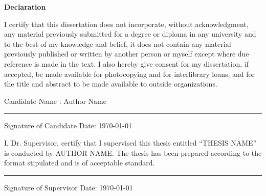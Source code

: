 \begin{center}
 \textbf{Declaration}\\
\end{center}


I certify that this dissertation does not incorporate, without acknowledgment, any material previously submitted for a degree or diploma in any university and to the best of my knowledge and belief, it does not contain any material previously published or written by another person or myself except where due reference is made in the text. I also hereby give consent for my dissertation, if accepted, be made available for photocopying and for interlibrary loans, and for the title and abstract to be made available to outside organizations.

\vspace{20mm}  %
Candidate Name : Author Name
\vspace{20mm}  %

\rule{60mm}{.15mm}\par   %
Signature of Candidate \hspace{40mm} Date: \today\par

\vspace{10mm}
I, Dr. Supervisor, certify that I supervised this thesis entitled “THESIS NAME” is conducted by AUTHOR NAME. The thesis has been prepared according to the format stipulated and is of acceptable standard.

\vspace{15mm}
\rule{60mm}{.15mm}\par
Signature of Supervisor \hspace{40mm} Date: \today\par

